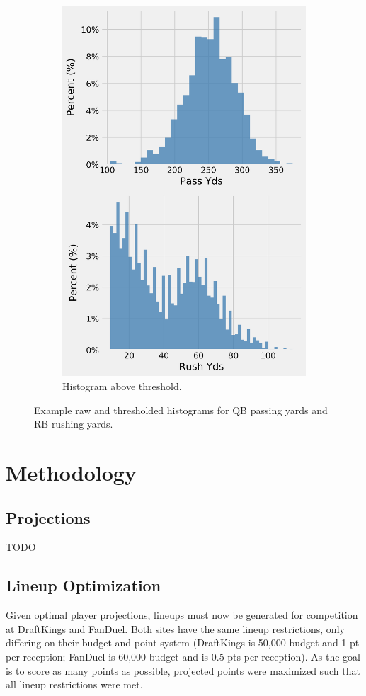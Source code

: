 \documentclass[12pt]{article}
\begin{document}
\begin{figure}[H]
\begin{subfigure}[b]{0.450\textwidth}
    \includegraphics[width=1\textwidth]{../figures/no_theshold_example_hists_RB}
    \caption{Histogram above threshold.}
  \end{subfigure}
  \caption{Example raw and thresholded histograms for QB passing yards and RB rushing yards.}
\end{figure}


\pagebreak
\section{Methodology}
\subsection{Projections}
TODO
\subsection{Lineup Optimization}
Given optimal player projections, lineups must now be generated for competition at DraftKings and FanDuel. Both sites have the same lineup restrictions, only differing on their budget and point system (DraftKings is 50,000 budget and 1 pt per reception; FanDuel is 60,000 budget and is 0.5 pts per reception). As the goal is to score as many points as possible, projected points were maximized such that all lineup restrictions were met. \bigskip
\end{document}
